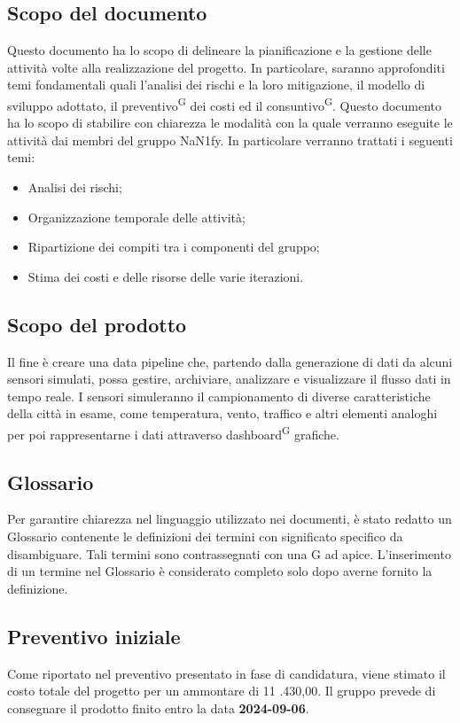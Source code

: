 \documentclass[8pt]{article}
\newcommand{\glossterm}[1]{#1\textsuperscript{G}} %
\begin{document}
\subsection{Scopo del documento}
Questo documento ha lo scopo di delineare la pianificazione e la gestione delle attività volte alla realizzazione del progetto. In particolare, saranno approfonditi temi fondamentali quali l'analisi dei rischi e la loro mitigazione, il modello di sviluppo adottato, il \glossterm{preventivo} dei costi ed il \glossterm{consuntivo}. Questo documento ha lo scopo di stabilire con chiarezza le modalità con la quale verranno eseguite
le attività dai membri del gruppo NaN1fy. In particolare verranno trattati i seguenti temi:
\begin{itemize}
\setlength\itemsep{0em}
    \item Analisi dei rischi;
    \item Organizzazione temporale delle attivit\`{a};
    \item Ripartizione dei compiti tra i componenti del gruppo;
    \item Stima dei costi e delle risorse delle varie iterazioni.
\end{itemize}
\subsection{Scopo del prodotto}
Il fine è creare una data pipeline che, partendo dalla generazione di dati da alcuni sensori simulati, possa gestire, archiviare, analizzare e visualizzare il flusso dati in tempo reale. I sensori simuleranno il campionamento di diverse caratteristiche della città in esame, come temperatura, vento, traffico e altri elementi analoghi per poi rappresentarne i dati attraverso \glossterm{dashboard} grafiche.
\subsection{Glossario}
Per garantire chiarezza nel linguaggio utilizzato nei documenti, è stato redatto un Glossario contenente le definizioni dei termini con significato specifico da disambiguare. Tali termini sono contrassegnati con una G ad apice. L'inserimento di un termine nel Glossario è considerato completo solo dopo averne fornito la definizione.


\subsection{Preventivo iniziale}
Come riportato nel preventivo presentato in fase di candidatura, viene stimato il costo totale del
progetto per un ammontare di 11 .430,00\;\texteuro. Il gruppo prevede di consegnare il
prodotto finito entro la data \textbf{2024-09-06}.
\end{document}
